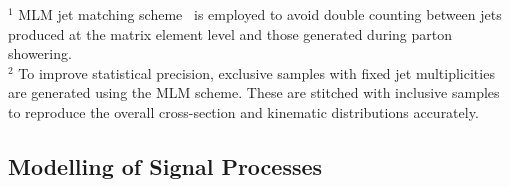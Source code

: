 {
\vspace{-1em}
\footnotesize
\begin{flushleft}
\hypertarget{DY_W-MLM}{}$^{1}$ MLM jet matching scheme~\cite{MLM} is employed to avoid double counting between jets produced at the matrix element level and those generated during parton showering. \\

\hypertarget{DY_W-Stitch}{}$^{2}$ To improve statistical precision, exclusive samples with fixed jet multiplicities are generated using the MLM scheme. These are stitched with inclusive samples to reproduce the overall cross-section and kinematic distributions accurately.
\end{flushleft}
}


\subsection{Modelling of Signal Processes}
